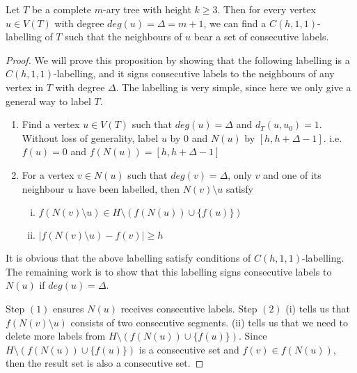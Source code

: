 \begin{proposition}
\label{prop:consecutive}
Let $T$ be a complete $m$-ary tree with height $k \ge 3$. Then for every vertex $u \in V(T)$ with degree $deg(u) = \Delta = m+1$, we can find a $C(h,1,1)$-labelling of $T$ such that the neighbours of $u$ bear a set of consecutive labels. 
\end{proposition}

\begin{proof}
We will prove this proposition by showing that the following labelling is a $C(h,1,1)$-labelling, and it signs consecutive labels to the neighbours of any vertex in $T$ with degree $\Delta$. The labelling is very simple, since here we only give a general way to label $T$. 
\begin{enumerate}[(1)]
\item Find a vertex $u \in V(T)$ such that $deg(u) = \Delta$ and $d_T(u, u_0) = 1$. Without loss of generality, label $u$ by $0$ and $N(u)$ by $[h, h+\Delta - 1]$. i.e. $f(u) = 0$ and $f(N(u)) = [h, h+\Delta -1]$
\item For a vertex $v \in N(u)$ such that $deg(v) = \Delta$, only $v$ and one of its neighbour $u$ have been labelled, then $N(v) \setminus u$ satisfy 
\begin{enumerate}[(i)]
\item $f(N(v) \setminus u) \in H \setminus \left(f(N(u)) \cup \{f(u)\} \right)$
\item $| f(N(v) \setminus u) - f(v) | \ge h$
\end{enumerate}
\end{enumerate}
It is obvious that the above labelling satisfy conditions of $C(h,1,1)$-labelling. The remaining work is to show that this labelling signs consecutive labels to $N(u)$ if $deg(u) = \Delta$. 

Step $(1)$ ensures $N(u)$ receives consecutive labels. Step $(2)$ (i) tells us that $f(N(v) \setminus u)$ consists of two consecutive segments. (ii) tells us that  we need to delete more labels from $H \setminus \left(f(N(u)) \cup \{f(u)\} \right)$. Since $H \setminus \left(f(N(u)) \cup \{f(u)\} \right)$ is a consecutive set and $f(v) \in f(N(u))$, then the result set is also a consecutive set. 
\end{proof}

